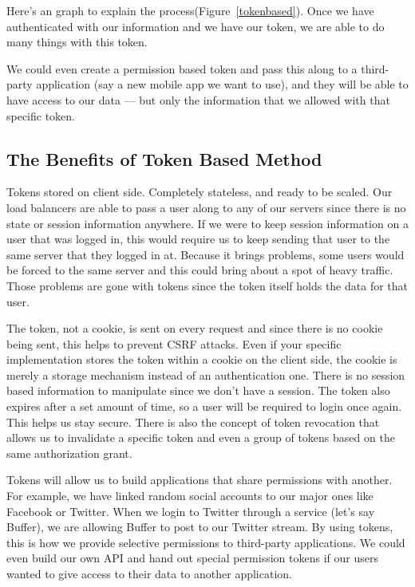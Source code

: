 \documentclass[journal,article,submit,moreauthors,pdftex,10pt,a4paper]{mdpi}
\begin{document}
Here’s an graph to explain the process(Figure~\ref{tokenbased}). Once we have authenticated with our information and we have our token, we are able to do many things with this token\cite{token-based-fast}.

We could even create a permission based token and pass this along to a third-party application (say a new mobile app we want to use\cite{token-based-mobile}), and they will be able to have access to our data — but only the information that we allowed with that specific token.

\subsection{The Benefits of Token Based Method}
Tokens stored on client side. Completely stateless, and ready to be scaled. Our load balancers are able to pass a user along to any of our servers since there is no state or session information anywhere. If we were to keep session information on a user that was logged in, this would require us to keep sending that user to the same server that they logged in at. Because it brings problems, some users would be forced to the same server and this could bring about a spot of heavy traffic. Those problems are gone with tokens since the token itself holds the data for that user.

The token, not a cookie, is sent on every request and since there is no cookie being sent, this helps to prevent CSRF attacks. Even if your specific implementation stores the token within a cookie on the client side, the cookie is merely a storage mechanism instead of an authentication one. There is no session based information to manipulate since we don’t have a session. The token also expires after a set amount of time, so a user will be required to login once again. This helps us stay secure. There is also the concept of token revocation that allows us to invalidate a specific token and even a group of tokens based on the same authorization grant\cite{evaluating-authentication}.

Tokens will allow us to build applications that share permissions with another. For example, we have linked random social accounts to our major ones like Facebook or Twitter. When we login to Twitter through a service (let’s say Buffer), we are allowing Buffer to post to our Twitter stream. By using tokens, this is how we provide selective permissions to third-party applications. We could even build our own API and hand out special permission tokens if our users wanted to give access to their data to another application.
\end{document}
